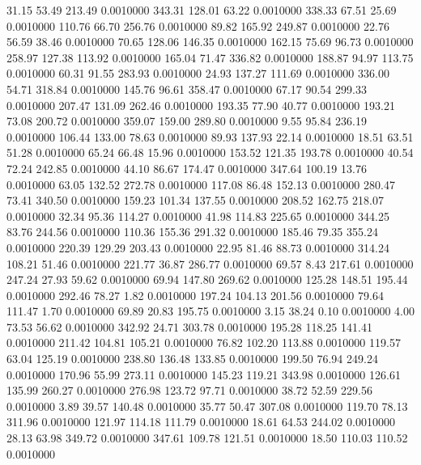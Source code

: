   31.15   53.49  213.49   0.0010000
 343.31  128.01   63.22   0.0010000
 338.33   67.51   25.69   0.0010000
 110.76   66.70  256.76   0.0010000
  89.82  165.92  249.87   0.0010000
  22.76   56.59   38.46   0.0010000
  70.65  128.06  146.35   0.0010000
 162.15   75.69   96.73   0.0010000
 258.97  127.38  113.92   0.0010000
 165.04   71.47  336.82   0.0010000
 188.87   94.97  113.75   0.0010000
  60.31   91.55  283.93   0.0010000
  24.93  137.27  111.69   0.0010000
 336.00   54.71  318.84   0.0010000
 145.76   96.61  358.47   0.0010000
  67.17   90.54  299.33   0.0010000
 207.47  131.09  262.46   0.0010000
 193.35   77.90   40.77   0.0010000
 193.21   73.08  200.72   0.0010000
 359.07  159.00  289.80   0.0010000
   9.55   95.84  236.19   0.0010000
 106.44  133.00   78.63   0.0010000
  89.93  137.93   22.14   0.0010000
  18.51   63.51   51.28   0.0010000
  65.24   66.48   15.96   0.0010000
 153.52  121.35  193.78   0.0010000
  40.54   72.24  242.85   0.0010000
  44.10   86.67  174.47   0.0010000
 347.64  100.19   13.76   0.0010000
  63.05  132.52  272.78   0.0010000
 117.08   86.48  152.13   0.0010000
 280.47   73.41  340.50   0.0010000
 159.23  101.34  137.55   0.0010000
 208.52  162.75  218.07   0.0010000
  32.34   95.36  114.27   0.0010000
  41.98  114.83  225.65   0.0010000
 344.25   83.76  244.56   0.0010000
 110.36  155.36  291.32   0.0010000
 185.46   79.35  355.24   0.0010000
 220.39  129.29  203.43   0.0010000
  22.95   81.46   88.73   0.0010000
 314.24  108.21   51.46   0.0010000
 221.77   36.87  286.77   0.0010000
  69.57    8.43  217.61   0.0010000
 247.24   27.93   59.62   0.0010000
  69.94  147.80  269.62   0.0010000
 125.28  148.51  195.44   0.0010000
 292.46   78.27    1.82   0.0010000
 197.24  104.13  201.56   0.0010000
  79.64  111.47    1.70   0.0010000
  69.89   20.83  195.75   0.0010000
   3.15   38.24    0.10   0.0010000
   4.00   73.53   56.62   0.0010000
 342.92   24.71  303.78   0.0010000
 195.28  118.25  141.41   0.0010000
 211.42  104.81  105.21   0.0010000
  76.82  102.20  113.88   0.0010000
 119.57   63.04  125.19   0.0010000
 238.80  136.48  133.85   0.0010000
 199.50   76.94  249.24   0.0010000
 170.96   55.99  273.11   0.0010000
 145.23  119.21  343.98   0.0010000
 126.61  135.99  260.27   0.0010000
 276.98  123.72   97.71   0.0010000
  38.72   52.59  229.56   0.0010000
   3.89   39.57  140.48   0.0010000
  35.77   50.47  307.08   0.0010000
 119.70   78.13  311.96   0.0010000
 121.97  114.18  111.79   0.0010000
  18.61   64.53  244.02   0.0010000
  28.13   63.98  349.72   0.0010000
 347.61  109.78  121.51   0.0010000
  18.50  110.03  110.52   0.0010000
